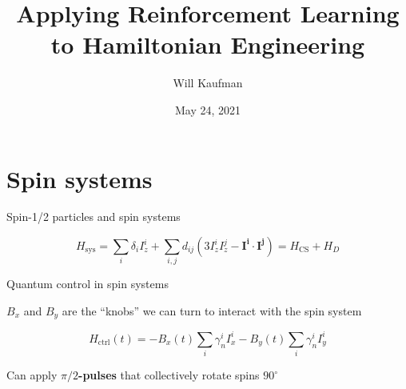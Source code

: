 \documentclass{beamer}
\title[RL for Hamiltonian Engineering]{Applying Reinforcement Learning to Hamiltonian Engineering}
\author[Will Kaufman]{
Will Kaufman\inst{1}
}
\date[Spring 2021]{May 24, 2021 \\
}
\institute[Dartmouth College]{
\inst{1}Department of Physics and Astronomy, Dartmouth College \\
Hanover, NH 03755, USA
}
\begin{document}
\frame{\titlepage}


\section{Spin systems}


\begin{frame}{Spin-1/2 particles and spin systems}

\begin{figure}
\centering
\begin{subfigure}{.49\textwidth}
    \centering
    \scalebox{.8}{
    
    }
\end{subfigure}
\begin{subfigure}{.49\textwidth}
    \centering
    \scalebox{.8}{
    
    }
\end{subfigure}
\end{figure}

% 

\[
H_{\text{sys}} =\sum _{i}\delta_{i} I^{i}_{z}
    + \sum _{i,j}d_{ij}\left( 3I^{i}_{z} I^{j}_{z} -\mathbf{I^{i}} \cdot \mathbf{I^{j}}\right)
    = H_{\text{CS}} + H_{D}
\]



\end{frame}


\begin{frame}{Quantum control in spin systems}

\begin{figure}
\centering

\end{figure}

$B_x$ and $B_y$ are the ``knobs'' we can turn to interact with the spin system

\[
    H_{\text{ctrl}}(t) = -B_x(t) \sum_i \gamma_n^i I_x^i -B_y(t) \sum_i \gamma_n^i I_y^i
\]

Can apply \textbf{$\pi/2$-pulses} that collectively rotate spins $90^\circ$



\end{frame}
\end{document}
